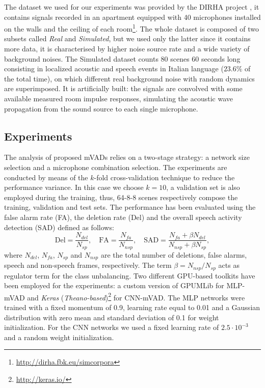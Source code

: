 The dataset we used for our experiments was provided by the DIRHA project \cite{cristoforetti2014dirha}, it contains signals recorded in an apartment equipped with 40 microphones installed on the walls and the ceiling of each room\footnote{\url{http://dirha.fbk.eu/simcorpora}}.
The whole dataset is composed of two subsets called \emph{Real} and \emph{Simulated}, but we used only the latter since it contains more data, it is characterised by higher noise source rate and a wide variety of background noises. 
The Simulated dataset counts 80 scenes 60 seconds long consisting in localized acoustic and speech events in Italian language ($23.6\%$ of the total time), on which different real background noise with random dynamics are superimposed. 
It is artificially built: the signals are convolved with some available measured room impulse responses, simulating the acoustic wave propagation from the sound source to each single microphone. 

\subsection{Experiments}

The analysis of proposed mVADs relies on a two-stage strategy: a network size selection and a microphone combination selection.
The experiments are conducted by means of the $k$-fold cross-validation technique to reduce the performance variance. In this case we choose $k=10$, a validation set is also employed during the training, thus, 64-8-8 scenes respectively compose the training, validation and test sets. 
The performance has been evaluated using the false alarm rate (FA), the deletion rate (Del) and the overall speech activity detection (SAD) defined as follows:
\begin{equation}
\text{Del} = \frac{N_{del}}{N_{sp}},  \quad  \text{FA} = \frac{N_{fa}}{N_{nsp}}, \quad \text{SAD} = \frac{N_{fa} + \beta N_{del}}{N_{nsp} + \beta N_{sp}},
\end{equation}
where $N_{del}$, $N_{fa}$, $N_{sp}$ and $N_{nsp}$ are the total number of deletions, false alarms, speech and non-speech frames, respectively. The term $\beta = N_{nsp}/N_{sp}$ acts as regulator term for the class unbalancing. Two different GPU-based toolkits have been employed for the experiments: a custom version of GPUMLib \cite{gpumlib} for MLP-mVAD and \emph{Keras} (\textit{Theano-based})\footnote{\url{http://keras.io/}} for CNN-mVAD. The MLP networks were trained with a fixed momentum of 0.9, learning rate equal to 0.01 and a Gaussian distribution with zero mean and standard deviation of 0.1 for weight initialization. For the CNN networks we used a fixed learning rate of $2.5\cdot10^{-3}$ and a random weight initialization.

